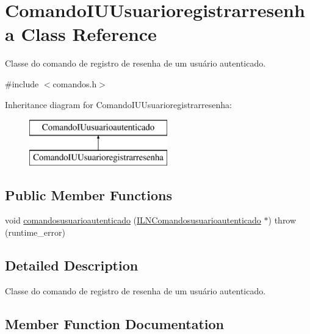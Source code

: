 \hypertarget{classComandoIUUsuarioregistrarresenha}{}\section{Comando\+I\+U\+Usuarioregistrarresenha Class Reference}
\label{classComandoIUUsuarioregistrarresenha}


Classe do comando de registro de resenha de um usuário autenticado.  




{\ttfamily \#include $<$comandos.\+h$>$}

Inheritance diagram for Comando\+I\+U\+Usuarioregistrarresenha\+:\begin{figure}[H]
\begin{center}
\leavevmode
\includegraphics[height=2.000000cm]{classComandoIUUsuarioregistrarresenha}
\end{center}
\end{figure}
\subsection*{Public Member Functions}
\begin{DoxyCompactItemize}
\item 
void \hyperlink{classComandoIUUsuarioregistrarresenha_a606646855da85764201ca85d37884a71}{comandosusuarioautenticado} (\hyperlink{classILNComandosusuarioautenticado}{I\+L\+N\+Comandosusuarioautenticado} $\ast$)  throw (runtime\+\_\+error)
\end{DoxyCompactItemize}


\subsection{Detailed Description}
Classe do comando de registro de resenha de um usuário autenticado. 

\subsection{Member Function Documentation}
\mbox{\label{classComandoIUUsuarioregistrarresenha_a606646855da85764201ca85d37884a71}} 
